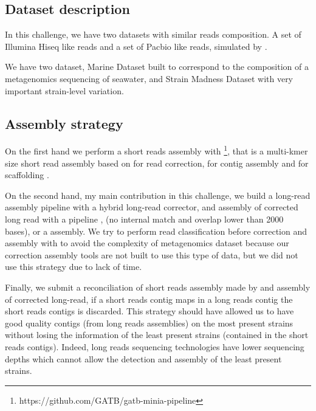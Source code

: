 \documentclass[main.tex]{subfiles}
\begin{document}
\subsection{Dataset description}

In this challenge, we have two datasets with similar reads composition. A set of Illumina Hiseq like reads and a set of Pacbio like reads, simulated by \cite{camisim}.

We have two dataset, Marine Dataset built to correspond to the composition of a metagenomics sequencing of seawater, and Strain Madness Dataset with very important strain-level variation.

\subsection{Assembly strategy}

On the first hand we perform a short reads assembly with  \footnote{https://github.com/GATB/gatb-minia-pipeline}, that is a multi-kmer size short read assembly based on  \cite{bloocoo} for read correction,  \cite{minia, bcalm} for contig assembly and  for scaffolding \cite{besst1, besst2, besst3}.

On the second hand, my main contribution in this challenge, we build a long-read assembly pipeline with  \cite{fmlrc} a hybrid long-read corrector, and assembly of corrected long read with a pipeline \minimap, \fpa (no internal match and overlap lower than 2000 bases), \miniasm or a \wtdbg assembly. We try to perform read classification before correction and assembly with \cite{centrifuge} to avoid the complexity of metagenomics dataset because our correction assembly tools are not built to use this type of data, but we did not use this strategy due to lack of time.

Finally, we submit a reconciliation of short reads assembly made by  and \wtdbg assembly of corrected long-read, if a short reads contig maps in a long reads contig the short reads contigs is discarded. This strategy should have allowed us to have good quality contigs (from long reads assemblies) on the most present strains without losing the information of the least present strains (contained in the short reads contigs). Indeed, long reads sequencing technologies have lower sequencing depths which cannot allow the detection and assembly of the least present strains.
\end{document}
